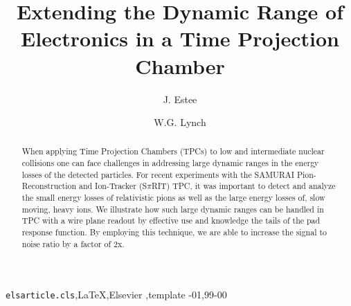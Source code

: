 \documentclass[review]{elsarticle}
\begin{document}
\begin{frontmatter}

\title{Extending the Dynamic Range of Electronics in a Time Projection Chamber}


\author[msu,nscl]{J. Estee}
\author[msu,nscl]{W.G. Lynch}

\address[msu]{Michigan State University, Dept. Physics and Astronomy }
\address[nscl]{National Superconducting Cyclotron Laboratory}

\begin{abstract}
When applying Time Projection Chambers  (TPCs) to low and intermediate nuclear collisions one can face challenges in addressing large dynamic ranges in the energy losses of the detected particles. For recent experiments with the SAMURAI Pion-Reconstruction and Ion-Tracker (S$\pi$RIT) TPC, it was important to detect and analyze the small energy losses of relativistic pions as well as the large energy losses of, slow moving, heavy ions.  We illustrate how such large dynamic ranges can be handled in TPC with a wire plane readout  by effective use and knowledge the tails of the pad response function. By employing this technique, we are able to increase the signal to noise ratio by a factor of 2x.
\end{abstract}

\begin{keyword}
\texttt{elsarticle.cls}\sep \LaTeX\sep Elsevier \sep template
-01\sep  99-00
\end{keyword}

\end{frontmatter}

\linenumbers
\end{document}
